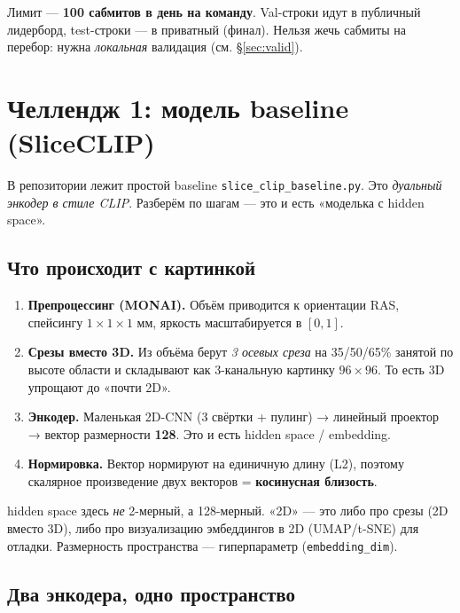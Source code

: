\documentclass[11pt,a4paper]{article}
\begin{document}
\begin{tradeoff}
Лимит — \textbf{100 сабмитов в день на команду}. Val-строки идут в публичный лидерборд,
test-строки — в приватный (финал). Нельзя жечь сабмиты на перебор: нужна \emph{локальная}
валидация (см. §\ref{sec:valid}).
\end{tradeoff}

\section{Челлендж 1: модель baseline (SliceCLIP)}

В репозитории лежит простой baseline \texttt{slice\_clip\_baseline.py}. Это \emph{дуальный энкодер
в стиле CLIP}. Разберём по шагам — это и есть «моделька с hidden space».

\subsection{Что происходит с картинкой}

\begin{enumerate}
\item \textbf{Препроцессинг (MONAI).} Объём приводится к ориентации RAS, спейсингу $1{\times}1{\times}1$ мм,
яркость масштабируется в $[0,1]$.
\item \textbf{Срезы вместо 3D.} Из объёма берут \emph{3 осевых среза} на 35/50/65\% занятой
по высоте области и складывают как 3-канальную картинку $96{\times}96$. То есть 3D упрощают до «почти 2D».
\item \textbf{Энкодер.} Маленькая 2D-CNN (3 свёртки + пулинг) → линейный проектор →
вектор размерности \textbf{128}. Это и есть hidden space / embedding.
\item \textbf{Нормировка.} Вектор нормируют на единичную длину (L2), поэтому скалярное
произведение двух векторов = \textbf{косинусная близость}.
\end{enumerate}

\begin{note}[Про «2D»]
hidden space здесь \emph{не} 2-мерный, а 128-мерный. «2D» — это либо про срезы (2D вместо 3D),
либо про визуализацию эмбеддингов в 2D (UMAP/t-SNE) для отладки. Размерность пространства —
гиперпараметр (\texttt{embedding\_dim}).
\end{note}

\subsection{Два энкодера, одно пространство}
\end{document}

